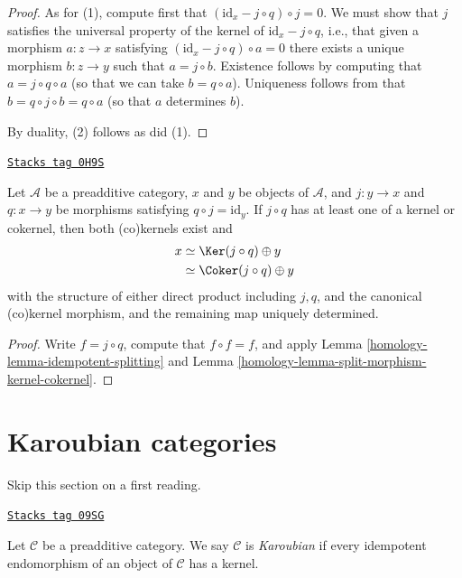 \begin{proof}
As for (1), compute first that $(\text{id} _ x - j \circ q) \circ j = 0$.
We must show that $j$ satisfies the universal property
of the kernel of $\text{id} _ {x} - j \circ q$,
i.e., that given a morphism $a : z \to x$
satisfying $(\text{id} _ x - j \circ q) \circ a = 0$
there exists a unique morphism $b : z \to y$
such that $a = j \circ b$.
Existence follows by computing that $a = j \circ q \circ a$
(so that we can take $b = q \circ a$).
Uniqueness follows from that $b = q \circ j \circ b = q \circ a$
(so that $a$ determines $b$).

\medskip\noindent
By duality, (2) follows as did (1).
\end{proof}

\begin{lemma}
\label{homology-lemma-split-morphism-splitting}
\href{https://stacks.math.columbia.edu/tag/0H9S}{\texttt{Stacks tag 0H9S}}

Let $\mathcal{A}$ be a preadditive category,
$x$ and $y$ be objects of $\mathcal{A}$,
and $j : y \to x$ and $q : x \to y$ be morphisms
satisfying $q \circ j = \text{id} _ y$.
If $j \circ q$ has at least one of a kernel or cokernel,
then both (co)kernels exist and
\begin{align*}
x
& \simeq \Ker (j \circ q) \oplus y \\
& \simeq \Coker (j \circ q) \oplus y
\end{align*}
with the structure of either direct product including $j , q$,
and the canonical (co)kernel morphism,
and the remaining map uniquely determined.
\end{lemma}

\begin{proof}

Write $f = j \circ q$,
compute that $f \circ f = f$,
and apply Lemma \ref{homology-lemma-idempotent-splitting}
and Lemma \ref{homology-lemma-split-morphism-kernel-cokernel}.
\end{proof}

\section{Karoubian categories}
\label{homology-section-karoubian}
Skip this section on a first reading.

\begin{definition}[Karoubian]
\label{homology-definition-karoubian}
\href{https://stacks.math.columbia.edu/tag/09SG}{\texttt{Stacks tag 09SG}}

Let $\mathcal{C}$ be a preadditive category. We say $\mathcal{C}$
is {\it Karoubian} if every idempotent endomorphism of an object
of $\mathcal{C}$ has a kernel.
\end{definition}

